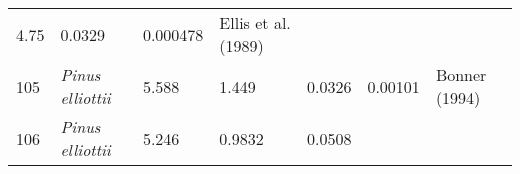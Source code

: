 \documentclass[]{article}
\begin{document}
\begin{longtable}[]{@{}lllllll@{}}
\begin{minipage}[t]{0.08\columnwidth}
4.75\strut
\end{minipage} & \begin{minipage}[t]{0.08\columnwidth}\raggedright
0.0329\strut
\end{minipage} & \begin{minipage}[t]{0.08\columnwidth}\raggedright
0.000478\strut
\end{minipage} & \begin{minipage}[t]{0.23\columnwidth}\raggedright
Ellis et al. (1989)\strut
\end{minipage}\tabularnewline
\begin{minipage}[t]{0.05\columnwidth}\raggedright
105\strut
\end{minipage} & \begin{minipage}[t]{0.23\columnwidth}\raggedright
\emph{Pinus elliottii}\strut
\end{minipage} & \begin{minipage}[t]{0.05\columnwidth}\raggedright
5.588\strut
\end{minipage} & \begin{minipage}[t]{0.08\columnwidth}\raggedright
1.449\strut
\end{minipage} & \begin{minipage}[t]{0.08\columnwidth}\raggedright
0.0326\strut
\end{minipage} & \begin{minipage}[t]{0.08\columnwidth}\raggedright
0.00101\strut
\end{minipage} & \begin{minipage}[t]{0.23\columnwidth}\raggedright
Bonner (1994)\strut
\end{minipage}\tabularnewline
\begin{minipage}[t]{0.05\columnwidth}\raggedright
106\strut
\end{minipage} & \begin{minipage}[t]{0.23\columnwidth}\raggedright
\emph{Pinus elliottii}\strut
\end{minipage} & \begin{minipage}[t]{0.05\columnwidth}\raggedright
5.246\strut
\end{minipage} & \begin{minipage}[t]{0.08\columnwidth}\raggedright
0.9832\strut
\end{minipage} & \begin{minipage}[t]{0.08\columnwidth}\raggedright
0.0508\strut
\end{minipage} & \begin{minipage}[t]{0.08\columnwidth}\raggedright

\end{minipage}
\end{longtable}
\end{document}
